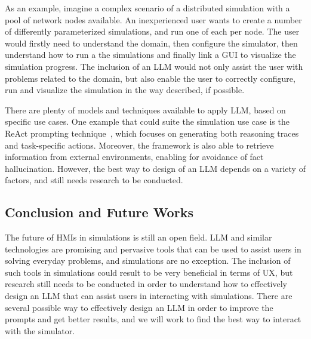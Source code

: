 \documentclass[conference]{IEEEtran}
\begin{document}
As an example,
imagine a complex scenario of a distributed simulation with a pool of network nodes available.
%
An inexperienced user wants to create a number of differently parameterized simulations,
and run one of each per node.
%
The user would firstly need to understand the domain,
then configure the simulator,
then understand how to run a the simulations and finally link a \ac{GUI} to visualize the simulation progress.
%
The inclusion of an \ac{LLM} would not only assist the user with problems related to the domain,
but also enable the user to correctly configure, run and visualize the simulation in the way described,
if possible.
%

There are plenty of models and techniques available to apply \ac{LLM},
based on specific use cases.
%
One example that could suite the simulation use case is the ReAct prompting technique~\cite{DBLP:conf/iclr/YaoZYDSN023},
which focuses on generating both reasoning traces and task-specific actions.
%
Moreover,
the framework is also able to retrieve information from external environments,
enabling for avoidance of fact hallucination.
%
However,
the best way to design of an \ac{LLM} depends on a variety of factors,
and still needs research to be conducted.

\subsection{Conclusion and Future Works}
%
The future of \acp{HMI} in simulations is still an open field.
%
\ac{LLM} and similar technologies are promising and pervasive tools that can be used to assist users in solving everyday problems,
and simulations are no exception.
%
The inclusion of such tools in simulations could result to be very beneficial in terms of \ac{UX},
but research still needs to be conducted in order to understand how to effectively design an \ac{LLM} that can assist users in interacting with simulations.
%
There are several possible way to effectively design an \ac{LLM} in order to improve the prompts and get better results,
and we will work to find the best way to interact with the simulator.



\vspace{12pt}
\end{document}

